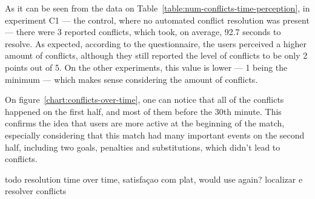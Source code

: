 As it can be seen from the data on Table~\ref{table:num-conflicts-time-perception}, in experiment C1 --- the control, where no automated conflict resolution was present --- there were 3 reported conflicts, which took, on average, 92.7 seconds to resolve. As expected, according to the questionnaire, the users perceived a higher amount of conflicts, although they still reported the level of conflicts to be only 2 points out of 5. On the other experiments, this value is lower --- 1 being the minimum --- which makes sense considering the amount of conflicts.

On figure~\ref{chart:conflicts-over-time}, one can notice that all of the conflicts happened on the first half, and most of them before the 30th minute. This confirms the idea that users are more active at the beginning of the match, especially considering that this match had many important events on the second half, including two goals, penalties and substitutions, which didn't lead to conflicts.


{\Huge todo resolution time over time, satisfaçao com plat, would use again? localizar e resolver conflicts}